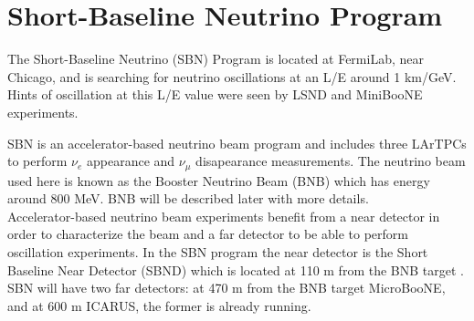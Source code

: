 \documentclass[a4paper]{article}\linespread{1.4}
\begin{document}

\clearpage

\section{Short-Baseline Neutrino Program}
\label{chap:sbnp}

The Short-Baseline Neutrino (SBN) Program is located at FermiLab, near Chicago, and is searching for neutrino oscillations at an L/E around 1 km/GeV. Hints of oscillation at this L/E value were seen by LSND and MiniBooNE experiments.

SBN is an accelerator-based neutrino beam program and includes three LArTPCs to perform $ \nu_{e}$ appearance and  $ \nu_{\mu}$ disapearance measurements. The neutrino beam used here is known as the Booster Neutrino Beam (BNB) which has energy around 800 MeV. BNB will be described later with more details.
\\Accelerator-based neutrino beam experiments benefit from a near detector in order to characterize the beam and a far detector to be able to perform oscillation experiments. In the SBN program the near detector is the Short Baseline Near Detector (SBND) which is located at 110 m from the BNB target \cite{prop}. SBN will have two far detectors: at 470 m from the BNB target MicroBooNE, and at 600 m ICARUS, the former is already running.
\end{document}
